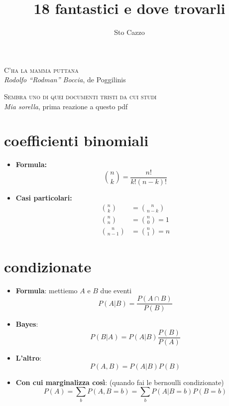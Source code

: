 \documentclass{article}
\title{18 fantastici e dove trovarli}
\author{Sto Cazzo}
\affil{Dipartimento di Matematica, Università della Vita}
\begin{document}
\maketitle
\newpage

\begin{flushright}
  \hspace{-2cm}
  \textsc{C'ha la mamma puttana} \\
  \textit{Rodolfo ``Rodman'' Boccia}, de Poggilinis
\end{flushright}

\begin{flushright}
  \hspace{-2cm}
  \textsc{Sembra uno di quei documenti tristi da cui studi} \\
  \textit{Mia sorella}, prima reazione a questo pdf
\end{flushright}
\tableofcontents
\newpage

\section{coefficienti binomiali}
\begin{itemize}
\item \textbf{Formula:}
  \[ \binom{n}{k} = \frac{n!}{k!(n-k)!} \]

\item \textbf{Casi particolari:}
  \begin{align*}
    \binom{n}{k} &= \binom{n}{n-k} \\
    \binom{n}{n} &= \binom{n}{0} = 1 \\
    \binom{n}{n-1} &= \binom{n}{1} = n
  \end{align*}
\end{itemize}

\section{condizionate}
\begin{itemize}
\item \textbf{Formula}:
  mettiemo $A$ e $B$ due eventi
  \[ P(A|B) = \frac{P(A \cap B)}{P(B)} \]
\item \textbf{Bayes}:
  \[ P(B|A) = P(A|B) \frac{P(B)}{P(A)} \]
\item \textbf{L'altro}:
  \[ P(A,B) = P(A|B) P(B) \]
\item \textbf{Con cui marginalizza così}: (quando fai le bernoulli condizionate)
  \[ P(A) = \sum_b P(A,B = b) = \sum_b P(A|B = b) P(B = b) \]
\end{itemize}
\end{document}
